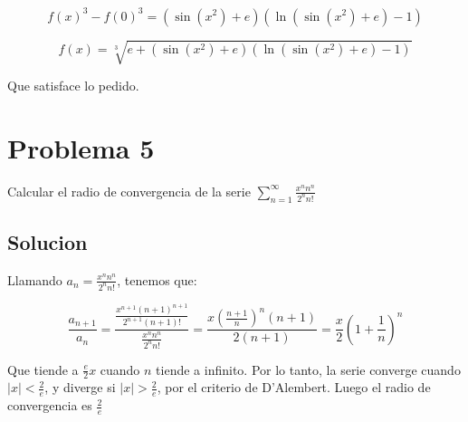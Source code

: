 \documentclass{article}
\begin{document}
$$f(x)^3 - f(0)^3 = (\sin (x^2) + e)(\ln(\sin (x^2) + e) - 1)$$

$$f(x) = \sqrt[3]{e + (\sin (x^2) + e)(\ln(\sin (x^2) + e) - 1)}$$

Que satisface lo pedido.

\section{Problema 5}

Calcular el radio de convergencia de la serie $\sum_{n=1}^\infty{\frac{x^nn^n}{2^n n!}}$

\subsection{Solucion}

Llamando $a_n = \frac{x^n n^n}{2^n n!}$, tenemos que:

$$\frac{a_{n+1}}{a_n} = \frac{\frac{x^{n+1}(n+1)^{n+1}}{2^{n+1}(n+1)!}}{\frac{x^n n^n}{2^n n!}} = \frac{x \left (\frac{n+1}{n} \right )^n (n+1)}{2(n+1)} =
 \frac{x}{2} \left (1 + \frac{1}{n} \right)^n$$

Que tiende a $\frac{e}{2}x$ cuando $n$ tiende a infinito. Por lo tanto, la serie converge cuando $|x| < \frac{2}{e}$, y diverge si
$|x| > \frac{2}{e}$, por el criterio de D'Alembert. Luego el radio de convergencia es $\frac{2}{e}$
\end{document}

